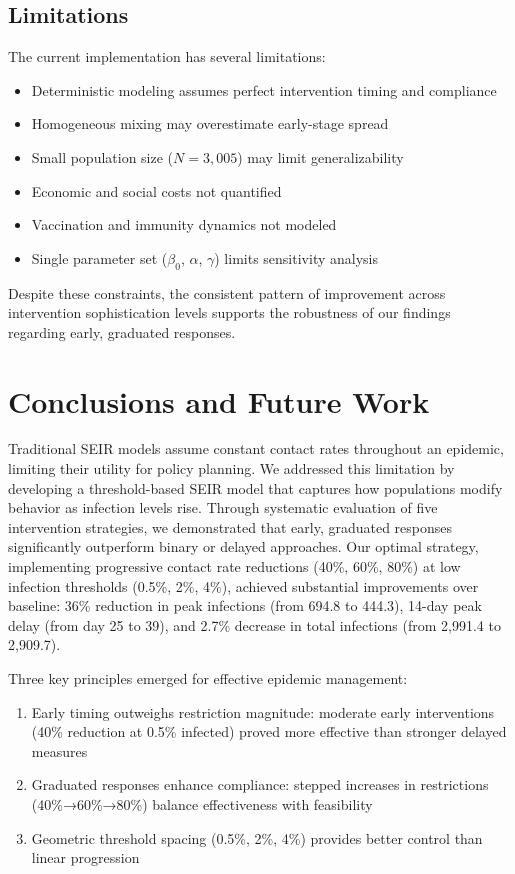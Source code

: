 \documentclass{article} %
\begin{document}
\subsection{Limitations}
The current implementation has several limitations:
\begin{itemize}
    \item Deterministic modeling assumes perfect intervention timing and compliance
    \item Homogeneous mixing may overestimate early-stage spread
    \item Small population size ($N=3{,}005$) may limit generalizability
    \item Economic and social costs not quantified
    \item Vaccination and immunity dynamics not modeled
    \item Single parameter set ($\beta_0$, $\alpha$, $\gamma$) limits sensitivity analysis
\end{itemize}

Despite these constraints, the consistent pattern of improvement across intervention sophistication levels supports the robustness of our findings regarding early, graduated responses.

\section{Conclusions and Future Work}
\label{sec:conclusion}

Traditional SEIR models assume constant contact rates throughout an epidemic, limiting their utility for policy planning. We addressed this limitation by developing a threshold-based SEIR model that captures how populations modify behavior as infection levels rise. Through systematic evaluation of five intervention strategies, we demonstrated that early, graduated responses significantly outperform binary or delayed approaches. Our optimal strategy, implementing progressive contact rate reductions (40\%, 60\%, 80\%) at low infection thresholds (0.5\%, 2\%, 4\%), achieved substantial improvements over baseline: 36\% reduction in peak infections (from 694.8 to 444.3), 14-day peak delay (from day 25 to 39), and 2.7\% decrease in total infections (from 2,991.4 to 2,909.7).

Three key principles emerged for effective epidemic management:
\begin{enumerate}
    \item Early timing outweighs restriction magnitude: moderate early interventions (40\% reduction at 0.5\% infected) proved more effective than stronger delayed measures
    \item Graduated responses enhance compliance: stepped increases in restrictions (40\%→60\%→80\%) balance effectiveness with feasibility
    \item Geometric threshold spacing (0.5\%, 2\%, 4\%) provides better control than linear progression
\end{enumerate}
\end{document}
